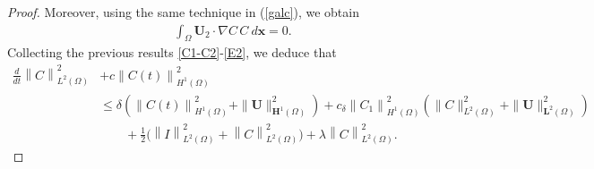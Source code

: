 \documentclass[10pt,number,preprint,times]{elsarticle}
\numberwithin{equation}{section} %
\begin{document}
\begin{proof}
	
	\noindent
		Moreover, using the same technique in (\ref{galc}), we obtain
		\begin{equation}\label{E2}
			\begin{aligned}
				\int_{\Omega} \boldsymbol{U}_{2} \cdot\nabla C\, C~d{\mathbf{x}}=0.
			\end{aligned}
		\end{equation} 
		Collecting the previous results \eqref{C1-C2}-\eqref{E2}, we deduce that
		\begin{equation}\label{estmtheta}
			\begin{split}
				\frac{d}{d t}\left\|C\right\|_{L^{2}(\Omega)}^{2}&+c\left\|C(t)\right\|_{H^{1}(\Omega)}^{2}
				\\&\leq \delta\left(\left\|C(t)\right\|_{H^{1}(\Omega)}^{2}+\|\boldsymbol{U}\|_{\mathbf{H}^{1}(\Omega)}^{2}\right)+c_{\delta}\left\|C_1\right\|_{H^{1}(\Omega)}^{2} \left(\|C\|_{L^{2}(\Omega)}^{2}+\|\boldsymbol{U}\|_{\mathbf{L}^{2}(\Omega)}^{2}\right)\\
				&\qquad+\frac{1}{2}\Big(\left\|I\right\|_{L^{2}(\Omega)}^{2}+\left\|C\right\|_{L^{2}(\Omega)}^{2}\Big)+\lambda\left\|C\right\|_{L^{2}(\Omega)}^{2}.
			\end{split}
		\end{equation}
		

\end{proof}
\end{document}
